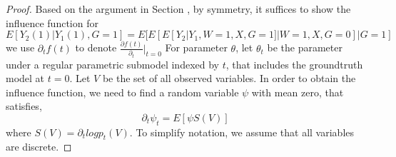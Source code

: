 \documentclass{article}
\begin{document}
\begin{proof}
    Based on the argument in Section \qu , by symmetry, it suffices to show the influence function  for $E[ Y_2(1) | Y_1(1) , G=1] = E[ E[E [ Y_2 | Y_1 ,W=1,X, G=1] | W=1, X, G=0 ] | G=1]$
    we use $ \partial_t f(t) $ to denote $\frac{ \partial f(t) }{ \partial_t } |_{t= 0 } $ For parameter $\theta $, let $ \theta_t $ be the parameter under a regular parametric submodel indexed by $t$, that includes the groundtruth model at $t=0$.
    Let $V$ be the set of all observed variables. In order to obtain the influence function, we need to find a random variable $\psi $ with mean zero, that satisfies, 
    \begin{equation}
        \partial_t \psi_t = E [ \psi S(V) ]
    \end{equation}
    where $ S(V) = \partial_t log p_t (V) $.
    To simplify notation, we assume that all variables are discrete. 


\end{proof}
\end{document}
